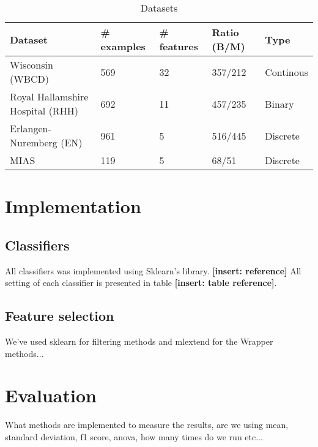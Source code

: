 \medskip
\begin{table}[ht!]
\begin{adjustwidth}{-5.in}{-5.in}
\begin{center}
   \begin{tabular}{l*{4}{l}}
   \hline
   Dataset         &
   \# examples  &
   \# features  &
   Ratio (B/M)     &
   Type            \\
   \hline
   Wisconsin (WBCD)						 &
   569                         &
   32                          &
   357/212                     &
   Continous                   \\
   Royal Hallamshire Hospital (RHH)  &
   692                         &
   11                          &
   457/235                     &
   Binary                      \\
   Erlangen-Nuremberg (EN)     &
   961                         &
   5                           &
   516/445                     &
   Discrete                    \\
   MIAS         							 &
   119                         &
   5                           &
   68/51                     	 &
   Discrete                    \\
  \hline
  \end{tabular}
  \caption{Datasets}
  \label{table:datasets_info}
\end{center}
\end{adjustwidth}
\end{table}


\section{Implementation}

\subsection{Classifiers}
All classifiers was implemented using Sklearn's library. \textbf{[insert: reference]} All setting of each classifier is presented in table \textbf{[insert: table reference]}.

\subsection{Feature selection}

We've used sklearn for filtering methods and mlextend for the Wrapper methods...

\section{Evaluation}

What methods are implemented to measure the results, are we using mean, standard deviation, f1 score, anova, how many times do we run etc...

